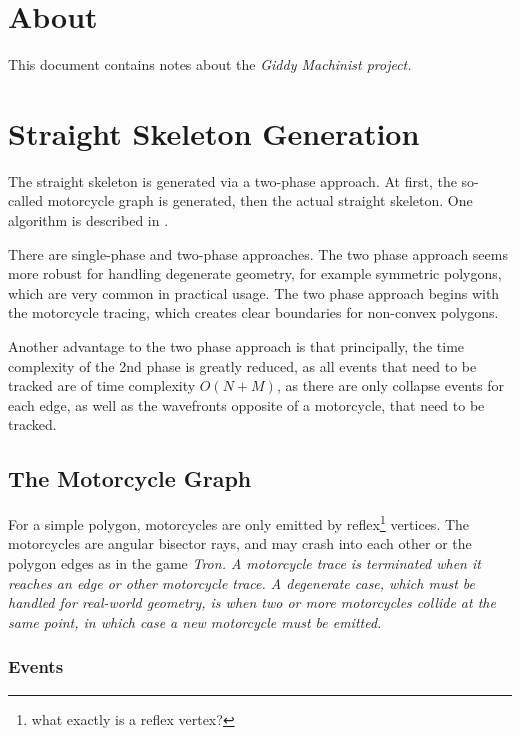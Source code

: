 \documentclass[12pt,a4paper,oneside,openany]{article}
\begin{document}
\tableofcontents

\listoffigures

\section*{About}

This document contains notes about the \em Giddy Machinist \em project.

\section{Straight Skeleton Generation}


The straight skeleton is generated via a two-phase approach. At first, the so-called motorcycle graph is generated, then the actual straight skeleton. One algorithm is described in \cite{ski}.

There are single-phase and two-phase approaches. The two phase approach seems more robust for handling degenerate geometry, for example symmetric polygons, which are very common in practical usage. The two phase approach begins with the motorcycle tracing, which creates clear boundaries for non-convex polygons. 

Another advantage to the two phase approach is that principally, the time complexity of the 2nd phase is greatly reduced, as all events that need to be tracked are of time complexity $O(N+M)$, as there are only collapse events for each edge, as well as the wavefronts opposite of a motorcycle, that need to be tracked.

\subsection{The Motorcycle Graph}

For a simple polygon, motorcycles are only emitted by reflex\footnote{what exactly is a reflex vertex?} vertices. The motorcycles are angular bisector rays, and may crash into each other or the polygon edges as in the game \em Tron\em . A motorcycle trace is terminated when it reaches an edge or other motorcycle trace. A degenerate case, which must be handled for real-world geometry, is when two or more motorcycles collide at the same point, in which case a new motorcycle must be emitted.

\subsubsection{Events}
\end{document}
